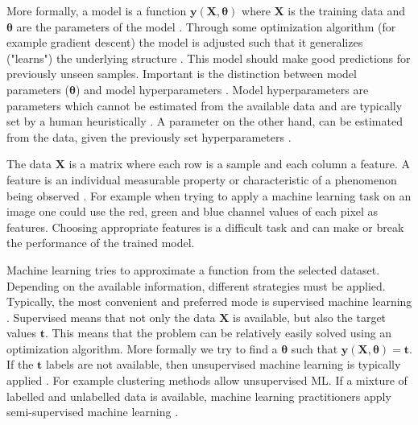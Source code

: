 \documentclass[draft,final,oneside]{vutinfth} %
\begin{document}
More formally, a model is a function $\boldsymbol{y}(\boldsymbol{X}, \boldsymbol{\theta})$ where $\boldsymbol{X}$ is the training data and $\boldsymbol{\theta}$ are the parameters of the model \cite{bishop}. Through some optimization algorithm (for example gradient descent) the model is adjusted such that it generalizes ("learns") the underlying structure \cite{anintroductiontoneuralnetworks}. This model should make good predictions for previously unseen samples. Important is the distinction between model parameters ($\boldsymbol{\theta}$) and model hyperparameters \cite{aimodern}. Model hyperparameters are parameters which cannot be estimated from the available data and are typically set by a human heuristically \cite{hyperparameter}. A parameter on the other hand, can be estimated from the data, given the previously set hyperparameters \cite{anintroductiontoneuralnetworks}.

The data $\boldsymbol{X}$ is a matrix where each row is a sample and each column a feature. A feature is an individual measurable property or characteristic of a phenomenon being observed \cite{bishop}. For example when trying to apply a machine learning task on an image one could use the red, green and blue channel values of each pixel as features. Choosing appropriate features is a difficult task and can make or break the performance of the trained model.

Machine learning tries to approximate a function from the selected dataset. Depending on the available information, different strategies must be applied. Typically, the most convenient and preferred mode is supervised machine learning \cite{aimodern}. Supervised means that not only the data $\boldsymbol{X}$ is available, but also the target values $\boldsymbol{t}$. This means that the problem can be relatively easily solved using an optimization algorithm. More formally we try to find a $\boldsymbol{\theta}$ such that $\boldsymbol{y}(\boldsymbol{X}, \boldsymbol{\theta}) = \boldsymbol{t}$. If the $\boldsymbol{t}$ labels are not available, then unsupervised machine learning is typically applied \cite{aimodern}. For example clustering methods allow unsupervised ML. If a mixture of labelled and unlabelled data is available, machine learning practitioners apply semi-supervised machine learning \cite{semisupervised}.
\end{document}
